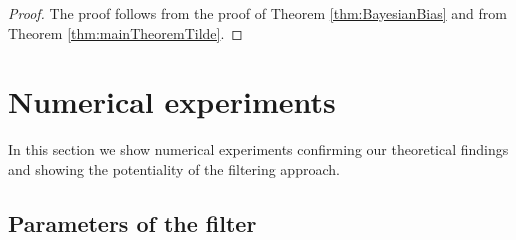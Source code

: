 \documentclass[10pt]{article}
\begin{document}
\begin{proof} The proof follows from the proof of Theorem \ref{thm:BayesianBias} and from Theorem \ref{thm:mainTheoremTilde}.
\end{proof}


\section{Numerical experiments}\label{sec:NumExp}

In this section we show numerical experiments confirming our theoretical findings and showing the potentiality of the filtering approach.

\subsection{Parameters of the filter}\label{sec:Num_Param}
\end{document}
